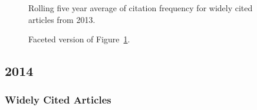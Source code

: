 \documentclass[
  10pt,
  letterpaper,
  DIV=11,
  numbers=noendperiod,
  twoside]{scrartcl}
\begin{document}
\begin{figure}


\caption{\label{fig-citation-spaghetti-2013}Rolling five year average of
citation frequency for widely cited articles from 2013.}

\end{figure}%

\begin{figure}


\caption{\label{fig-citation-facet-2013}Faceted version of
Figure~\ref{fig-citation-spaghetti-2013}.}

\end{figure}%

\newpage

\subsection{2014}\label{sec-s2014}

\subsubsection*{Widely Cited Articles}\label{widely-cited-articles-58}
\end{document}
